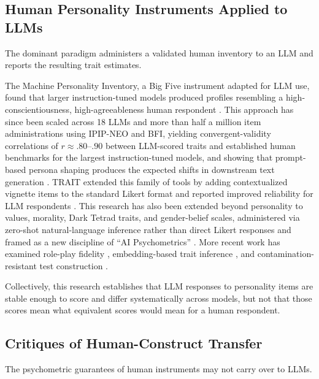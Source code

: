 \documentclass[11pt]{article}
\begin{document}
\subsection{Human Personality Instruments Applied to LLMs}
\label{sec:rw-instruments}

The dominant paradigm administers a validated human inventory to an LLM and reports the resulting trait estimates.

The Machine Personality Inventory, a Big Five instrument adapted for LLM use, found that larger instruction-tuned models produced profiles resembling a high-conscientiousness, high-agreeableness human respondent \citep{jiang2023mpi}.
This approach has since been scaled across 18 LLMs and more than half a million item administrations using IPIP-NEO and BFI, yielding convergent-validity correlations of $r \approx .80$--$.90$ between LLM-scored traits and established human benchmarks for the largest instruction-tuned models, and showing that prompt-based persona shaping produces the expected shifts in downstream text generation \citep{serapio2025personality}.
TRAIT extended this family of tools by adding contextualized vignette items to the standard Likert format and reported improved reliability for LLM respondents \citep{lee2025trait}.
This research has also been extended beyond personality to values, morality, Dark Tetrad traits, and gender-belief scales, administered via zero-shot natural-language inference rather than direct Likert responses and framed as a new discipline of ``AI Psychometrics'' \citep{pellert2024aipsychometrics}.
More recent work has examined role-play fidelity \citep{wang2025gpt4roleplay}, embedding-based trait inference \citep{maharjan2025personality}, and contamination-resistant test construction \citep{bhandari2025personality}.

Collectively, this research establishes that LLM responses to personality items are stable enough to score and differ systematically across models, but not that those scores mean what equivalent scores would mean for a human respondent.

\subsection{Critiques of Human-Construct Transfer}
\label{sec:rw-critiques}

The psychometric guarantees of human instruments may not carry over to LLMs.
\end{document}
